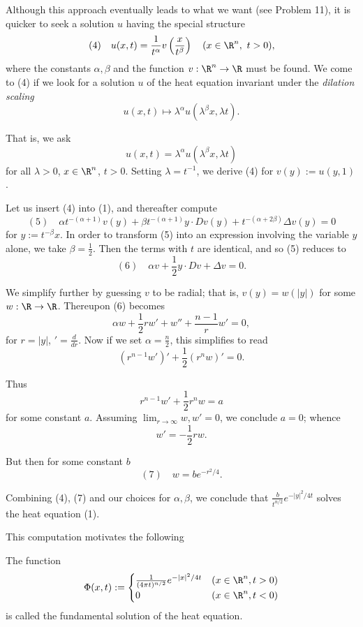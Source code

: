 Although this approach eventually leads to what we want (see Problem 11), it is quicker to seek a solution $u$ having the special structure
$$(4) \quad u(x,t) = \frac{1}{t^\alpha}v\left(\frac{x}{t^\beta}\right) \quad (x \in \R^n,\ t>0),$$
where the constants $\alpha,\beta$ and the function $v : \R^n \to \R$ must be found. We come to (4) if we look for a solution $u$ of the heat equation invariant under the \textit{dilation scaling}
$$u(x,t) \mapsto \lambda^\alpha u(\lambda^\beta x,\lambda t).$$

That is, we ask
$$u(x,t) = \lambda^\alpha u(\lambda^\beta x,\lambda t)$$
for all $\lambda > 0$, $x \in \R^n$, $t>0$. Setting $\lambda = t^{-1}$, we derive (4) for $v(y) := u(y,1)$.

Let us insert (4) into (1), and thereafter compute
$$(5) \quad \alpha t^{-(\alpha+1)}v(y) + \beta t^{-(\alpha+1)}y\cdot Dv(y) + t^{-(\alpha+2\beta)}\Delta v(y) = 0$$
for $y := t^{-\beta}x$. In order to transform (5) into an expression involving the variable $y$ alone, we take $\beta = \frac12$. Then the terms with $t$ are identical, and so (5) reduces to
$$(6) \quad \alpha v + \frac12 y \cdot Dv + \Delta v = 0.$$

We simplify further by guessing $v$ to be radial; that is, $v(y) = w(|y|)$ for some $w : \R \to \R$. Thereupon (6) becomes
$$\alpha w + \frac12 rw' + w'' + \frac{n-1}{r}w' = 0,$$
for $r = |y|$, $' = \frac{d}{dr}$. Now if we set $\alpha = \frac{n}{2}$, this simplifies to read
$$(r^{n-1}w')' + \frac{1}{2}(r^n w)' = 0.$$

Thus
$$r^{n-1}w' + \frac{1}{2}r^n w = a$$
for some constant $a$. Assuming $\lim_{r \to \infty} w, w' = 0$, we conclude $a = 0$; whence
$$w' = -\frac{1}{2}rw.$$

But then for some constant $b$
$$(7) \quad w = be^{-r^2/4}.$$

Combining (4), (7) and our choices for $\alpha, \beta$, we conclude that $\frac{b}{t^{n/2}}e^{-|y|^2/4t}$ solves the heat equation (1).

This computation motivates the following

\begin{definition}
\label{def:fundamental-solution-heat-equation}
\leanok
The function
$$\Phi(x,t) := \begin{cases} \frac{1}{(4\pi t)^{n/2}} e^{-|x|^2/4t} & (x \in \R^n, t > 0) \\ 0 & (x \in \R^n, t < 0) \end{cases}$$
is called the fundamental solution of the heat equation.
\end{definition}

